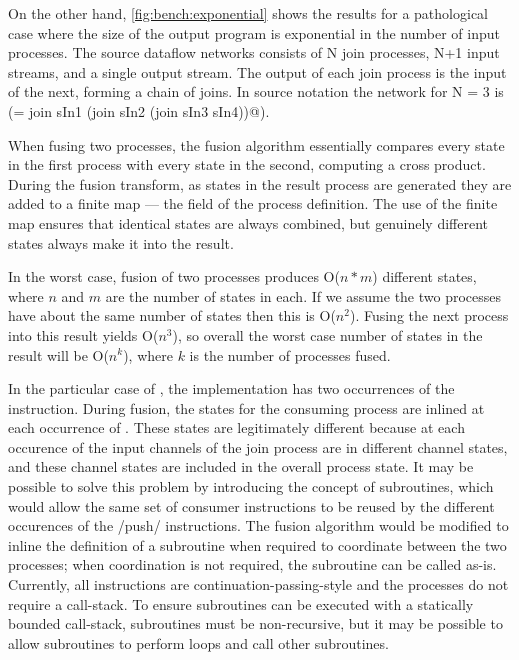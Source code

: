 On the other hand, \cref{fig:bench:exponential} shows the results for a pathological case where the size of the output program is exponential in the number of input processes. The source dataflow networks consists of N join processes, N+1 input streams, and a single output stream. The output of each join process is the input of the next, forming a chain of joins. In source notation the network for N = 3 is (\Hs@sOut = join sIn1 (join sIn2 (join sIn3 sIn4))@).

When fusing two processes, the fusion algorithm essentially compares every state in the first process with every state in the second, computing a cross product. During the fusion transform, as states in the result process are generated they are added to a finite map --- the \Hs@instrs@ field of the process definition. The use of the finite map ensures that identical states are always combined, but genuinely different states always make it into the result. 

In the worst case, fusion of two processes produces O($n*m$) different states, where $n$ and $m$ are the number of states in each. If we assume the two processes have about the same number of states then this is O($n^2$). Fusing the next process into this result yields O($n^3$), so overall the worst case number of states in the result will be O($n^k$), where $k$ is the number of processes fused. 

In the particular case of \Hs@join@, the implementation has two occurrences of the \Hs@push@ instruction.
During fusion, the states for the consuming process are inlined at each occurrence of \Hs@push@.
These states are legitimately different because at each occurence of \Hs@push@ the input channels of the join process are in different channel states, and these channel states are included in the overall process state.
It may be possible to solve this problem by introducing the concept of subroutines, which would allow the same set of consumer instructions to be reused by the different occurences of the \Hs/push/ instructions.
The fusion algorithm would be modified to inline the definition of a subroutine when required to coordinate between the two processes; when coordination is not required, the subroutine can be called as-is.
Currently, all instructions are continuation-passing-style and the processes do not require a call-stack.
To ensure subroutines can be executed with a statically bounded call-stack, subroutines must be non-recursive, but it may be possible to allow subroutines to perform loops and call other subroutines.

